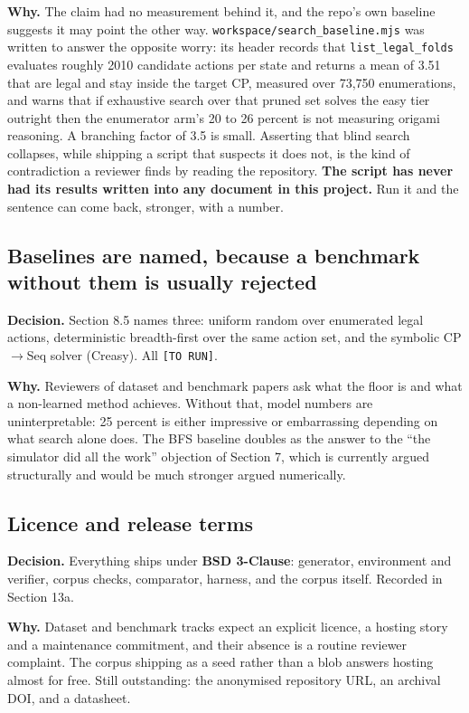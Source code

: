 \textbf{Why.} The claim had no measurement behind it, and the repo's own baseline suggests it may
point the other way. \texttt{workspace/search\_baseline.mjs} was written to answer the opposite
worry: its header records that \texttt{list\_legal\_folds} evaluates roughly 2010 candidate actions
per state and returns a mean of 3.51 that are legal and stay inside the target CP, measured over
73,750 enumerations, and warns that if exhaustive search over that pruned set solves the easy tier
outright then the enumerator arm's 20 to 26 percent is not measuring origami reasoning. A branching
factor of 3.5 is small. Asserting that blind search collapses, while shipping a script that
suspects it does not, is the kind of contradiction a reviewer finds by reading the repository.
\textbf{The script has never had its results written into any document in this project.} Run it and
the sentence can come back, stronger, with a number.

\subsection{Baselines are named, because a benchmark without them is usually rejected}

\textbf{Decision.} Section 8.5 names three: uniform random over enumerated legal actions,
deterministic breadth-first over the same action set, and the symbolic CP$\rightarrow$Seq solver
(Creasy). All \texttt{[TO RUN]}.

\textbf{Why.} Reviewers of dataset and benchmark papers ask what the floor is and what a non-learned
method achieves. Without that, model numbers are uninterpretable: 25 percent is either impressive
or embarrassing depending on what search alone does. The BFS baseline doubles as the answer to the
``the simulator did all the work'' objection of Section 7, which is currently argued structurally
and would be much stronger argued numerically.

\subsection{Licence and release terms}

\textbf{Decision.} Everything ships under \textbf{BSD 3-Clause}: generator, environment and
verifier, corpus checks, comparator, harness, and the corpus itself. Recorded in Section 13a.

\textbf{Why.} Dataset and benchmark tracks expect an explicit licence, a hosting story and a
maintenance commitment, and their absence is a routine reviewer complaint. The corpus shipping as a
seed rather than a blob answers hosting almost for free. Still outstanding: the anonymised
repository URL, an archival DOI, and a datasheet.


